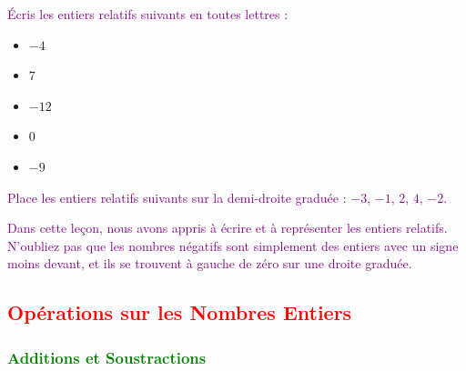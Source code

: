 \documentclass{article}
\begin{document}
\begin{tcolorbox}[colback=yellow!10!white, colframe=yellow!80!black, title=\textcolor{white}{Exercices}, sharp corners=southwest]

\textcolor{purple}{
Écris les entiers relatifs suivants en toutes lettres :
}
\begin{itemize}
    \item $-4$
    \item $7$
    \item $-12$
    \item $0$
    \item $-9$
\end{itemize}

\vspace{0.4cm}

\textcolor{purple}{
Place les entiers relatifs suivants sur la demi-droite graduée : $-3$, $-1$, $2$, $4$, $-2$.
}
\begin{center}
\end{center}

\end{tcolorbox}

\vspace{0.5cm}

\begin{tcolorbox}[colback=yellow!10!white, colframe=cyan!80!black, title=\textcolor{black}{Récapitulatif}, sharp corners=southwest]
\textcolor{purple}{Dans cette leçon, nous avons appris à écrire et à représenter les entiers relatifs. N'oubliez pas que les nombres négatifs sont simplement des entiers avec un signe moins devant, et ils se trouvent à gauche de zéro sur une droite graduée.}
\end{tcolorbox}

\subsection{\textcolor{red}{Opérations sur les Nombres Entiers}}

\subsubsection{\textcolor{green}{Additions et Soustractions}}
\end{document}
